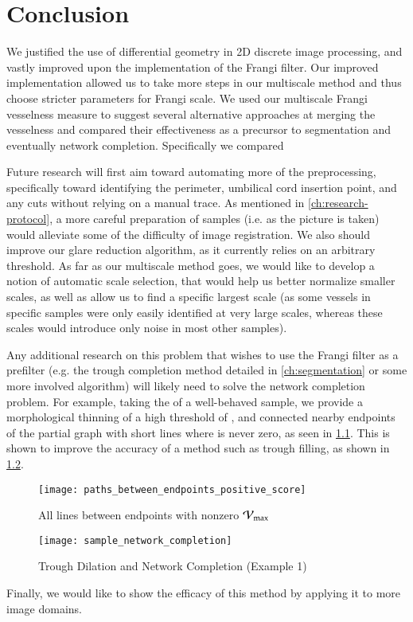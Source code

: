 \chapter{Conclusion} \label{ch:conclusion}

We justified the use of differential geometry in 2D discrete image processing, and vastly improved upon the implementation of the Frangi filter. Our improved implementation allowed us to take more steps in our multiscale method and thus choose stricter parameters for Frangi scale. We used our multiscale Frangi vesselness measure to suggest several alternative approaches at merging the vesselness and compared their effectiveness as a precursor to segmentation and eventually network completion. Specifically we compared 

Future research will first aim toward automating more of the preprocessing, specifically toward identifying the perimeter, umbilical cord insertion point, and any cuts without relying on a manual trace.  As mentioned in \cref{ch:research-protocol}, a more careful preparation of samples (i.e. as the picture is taken) would alleviate some of the difficulty of image registration. We also should improve our glare reduction algorithm, as it currently relies on an arbitrary threshold. As far as our multiscale method goes, we would like to develop a notion of automatic scale selection, that would help us better normalize smaller scales, as well as allow us to find a specific largest scale (as some vessels in specific samples were only easily identified at very large scales, whereas these scales would introduce only noise in most other samples).

Any additional research on this problem that wishes to use the Frangi filter as a prefilter  (e.g. the trough completion method detailed in \cref{ch:segmentation} or some more involved algorithm) will likely need to solve the network completion problem. For example, taking the \Vmax of a well-behaved sample, we provide a morphological thinning of a high threshold of \Vmax, and connected nearby endpoints of the partial graph with short lines where \Vmax is never zero, as seen in \cref{fig:network-completion-all-pairs}. This is shown to improve the accuracy of a method such as trough filling, as shown in \cref{fig:network-completion-demo-1}.

\begin{figure}
  \texttt{[image: paths\_between\_endpoints\_positive\_score]}
  \caption{All lines between endpoints with nonzero $\mathcal{V}_{\max}$}
  \label{fig:network-completion-all-pairs}
\end{figure}

\begin{figure}
	\texttt{[image: sample\_network\_completion]}
	\caption{Trough Dilation and Network Completion (Example 1)}
	\label{fig:network-completion-demo-1}
\end{figure}

Finally, we would like to show the efficacy of this method by applying it to more image domains.